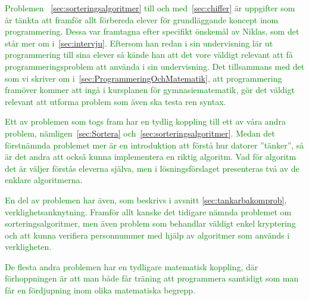 \textcolor{green}{Problemen ~\ref{sec:sorteringsalgoritmer} till och med~\ref{sec:chiffer} är uppgifter som är tänkta att framför allt förbereda elever för grundläggande koncept inom programmering. Dessa var framtagna efter specifikt önskemål av Niklas, som det står mer om i~\ref{sec:intervju}. Eftersom han redan i sin undervisning lär ut programmering till sina elever så kände han att det vore väldigt relevant att få programmeringsproblem att använda i sin undervisning. Det tillsammans med det som vi skriver om i~\ref{sec:ProgrammeringOchMatematik}, att programmering framöver kommer att ingå i kursplanen för gymnasiematematik, gör det väldigt relevant att utforma problem som även ska testa ren syntax.}

\textcolor{green}{Ett av problemen som togs fram har en tydlig koppling till ett av våra andra problem, nämligen~\ref{sec:Sortera} och~\ref{sec:sorteringsalgoritmer}. Medan det förstnämnda problemet mer är en introduktion att förstå hur datorer ''tänker'', så är det andra att också kunna implementera en riktig algoritm. Vad för algoritm det är väljer förstås eleverna själva, men i lösningsförslaget presenteras två av de enklare algoritmerna.}

\textcolor{green}{En del av problemen har även, som beskrivs i avsnitt \ref{sec:tankarbakomprob}, verklighetsanknytning. Framför allt kanske det tidigare nämnda problemet om sorteringsalgoritmer, men även problem som behandlar väldigt enkel kryptering och att kunna verifiera personnummer med hjälp av algoritmer som används i verkligheten.}

\textcolor{green}{De flesta andra problemen har en tydligare matematisk koppling, där förhoppningen är att man både får träning att programmera samtidigt som man får en fördjupning inom olika matematiska begrepp.}